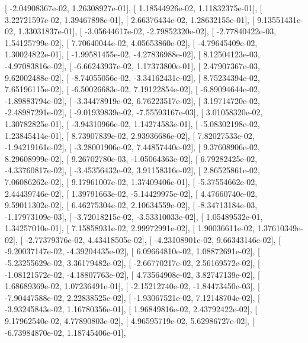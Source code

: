 \documentclass{article}
\begin{document}
       [ -2.04908367e-02,   1.26308927e-01],
       [  1.18544926e-02,   1.11832375e-01],
       [  3.22721597e-02,   1.39467898e-01],
       [  2.66376434e-02,   1.28632155e-01],
       [  9.13551431e-02,   1.33031837e-01],
       [ -3.05644617e-02,  -2.79852320e-02],
       [ -2.77840422e-03,   1.54125799e-02],
       [  7.70640044e-02,   4.05653860e-02],
       [ -4.79645409e-02,   1.30024822e-01],
       [ -1.99581455e-02,  -4.27836988e-02],
       [  8.12504123e-03,  -4.97083816e-02],
       [ -6.66243937e-02,   1.17373800e-01],
       [  2.47907367e-03,   9.62002488e-02],
       [ -8.74055056e-02,  -3.34162431e-02],
       [  8.75234394e-02,   7.65196115e-02],
       [ -6.50026683e-02,   7.19122854e-02],
       [ -6.89094644e-02,  -1.89883794e-02],
       [ -3.34478919e-02,   6.76223517e-02],
       [  3.19714720e-02,  -2.48987291e-02],
       [ -9.01939839e-02,  -7.55593167e-03],
       [  3.01058320e-02,   1.30782825e-01],
       [ -3.94310966e-02,   1.14274583e-01],
       [ -5.08302198e-02,   1.23845414e-01],
       [  8.73907839e-02,   2.93936686e-02],
       [  7.82027533e-02,  -1.94219161e-02],
       [ -3.28001906e-02,   7.44857440e-02],
       [  9.37608906e-02,   8.29608999e-02],
       [  9.26702780e-03,  -1.05064363e-02],
       [  6.79282425e-02,  -4.33760817e-02],
       [ -3.45356432e-02,   3.91158316e-02],
       [  2.86525861e-02,   7.06086262e-02],
       [  9.17961007e-02,   1.37409406e-01],
       [ -5.37554662e-02,   2.44439746e-02],
       [  1.39791663e-02,  -5.14429975e-02],
       [  4.47660740e-02,   9.59011302e-02],
       [  6.46275304e-02,   2.10634559e-02],
       [ -8.34713184e-03,  -1.17973109e-03],
       [ -3.72018215e-02,  -3.53310033e-02],
       [  1.05489532e-01,   1.34257010e-01],
       [  7.15858931e-02,   2.99972991e-02],
       [  1.90036611e-02,   1.37610349e-02],
       [ -2.77379376e-02,   4.43418505e-02],
       [ -4.23108901e-02,   9.66343146e-02],
       [ -9.20037147e-02,  -4.39204435e-02],
       [  6.09664810e-02,   1.08872691e-02],
       [ -5.23255629e-02,   3.36179482e-02],
       [ -2.66770217e-02,   2.56169572e-02],
       [ -1.08121572e-02,  -4.18807763e-02],
       [  4.73564908e-02,   3.82747139e-02],
       [  1.68689369e-02,   1.07236491e-01],
       [ -2.15212740e-02,  -1.84473450e-03],
       [ -7.90447588e-02,   2.22838525e-02],
       [ -1.93067521e-02,   7.12148704e-02],
       [ -3.93245843e-02,   1.16780356e-01],
       [  1.96849816e-02,   2.43792422e-02],
       [  9.17962540e-02,   4.77890803e-02],
       [  4.96595719e-02,   5.62986727e-02],
       [ -6.73984870e-02,   1.18745406e-01],
\end{document}
